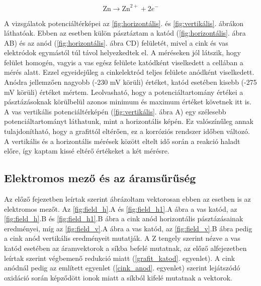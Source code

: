 \begin{equation}
\textrm{Zn} \longrightarrow \textrm{Zn}^{2+} + 2e^- 
\label{cink_anod}
\end{equation}


A vizsgálatok potenciáltérképei az \ref{fig:horizontális}. és \ref{fig:vertikális}. ábrákon láthatóak. Ebben az esetben külön pásztáztam a katód (\ref{fig:horizontális}. ábra AB) és az anód (\ref{fig:horizontális}. ábra CD) felületét, mivel a cink és vas elektródok egymástól túl távol helyezkedtek el. A méréseken jól látszik, hogy felület homogén, vagyis a vas egész felülete katódként viselkedett a cellában a mérés alatt. Ezzel egyeidejűleg a cinkelektród teljes felülete anódként viselkedett. Anódra jellemzően nagyobb (-230 mV körüli) értéket, katód esetében kisebb (-275 mV körüli) értéket mértem. Leolvasható, hogy a potenciáltartomány értékei a pásztázásoknak körülbelül azonos minimum és maximum értéket követnek itt is. A vas vertikális potenciáltérképén (\ref{fig:vertikális}. ábra A) egy szélesebb potenciáltartományt láthatunk, mint a horizontális képén. Ez valószínűleg annak tulajdonítható, hogy a grafittól eltérően, ez a korróziós rendszer időben változó. A vertikális és a horizontális mérések között eltelt idő során a reakció haladt előre, így kaptam kissé eltérő értékeket a két mérésre. 

\subsection{Elektromos mező és az áramsűrűség}

Az előző fejezetben leírtak szerint ábrázoltam vektorosan ebben az esetben is az elektromos mezőt. Az \ref{fig:field_h}.A és \ref{fig:field_h1}.A ábra a vas katód, az \ref{fig:field_h}.B és \ref{fig:field_h1}.B ábra a cink anód horizontális pásztázásainak eredményei, míg az \ref{fig:field_v}.A ábra a vas katód, az \ref{fig:field_v}.B ábra pedig a cink anód vertikális eredményeit mutatják. A Z tengely szerint nézve a vas katód esetében az áramvektorok a síkba befelé mutatnak, az előző alfejezetben leírtak szerint végbemenő redukció miatt (\ref{grafit_katod}. egyenlet). A cink anódnál pedig az említett egyenlet (\ref{cink_anod}. egyenlet) szerint lejátszódó oxidáció során képződött ionok miatt a síkból kifelé mutatnak a vektorok.

